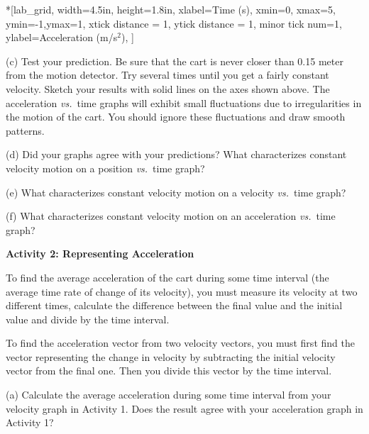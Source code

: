 \begin{lab_axis}*[lab_grid,
	width=4.5in, height=1.8in,
	xlabel={Time (s)},
	xmin=0, xmax=5,
	ymin=-1,ymax=1, 
	xtick distance = 1, 
	ytick distance = 1, 
	minor tick num=1,
	ylabel={Acceleration (m/s$^2$)},
	]
\end{lab_axis}



(c) Test your prediction. Be sure that the cart is never closer than 0.15 meter
from the motion detector. Try several times until you get a fairly constant
velocity. Sketch your results with solid lines on the axes shown above. The
acceleration \textit{vs.}~time graphs will exhibit small fluctuations due to irregularities
in the motion of the cart. You should ignore these fluctuations and draw smooth
patterns.
\answerspace{0.2in}

\pagebreak[2]
(d) Did your graphs agree with your predictions? What characterizes constant
velocity motion on a position \textit{vs.}~time graph? 
\answerspace{10mm}

(e) What characterizes constant velocity motion on a velocity \textit{vs.}~time graph?
\answerspace{10mm}

(f) What characterizes constant velocity motion on an acceleration \textit{vs.}~time graph?
\answerspace{10mm}

\textbf{Activity 2: Representing Acceleration} 

To find the average acceleration of the cart during some time interval (the
average time rate of change of its velocity), you must measure its velocity
at two different times, calculate the difference between the final value and
the initial value and divide by the time interval.

To find the acceleration vector from two velocity vectors, you must first find
the vector representing the change in velocity by subtracting the initial velocity
vector from the final one. Then you divide this vector by the time interval. 


(a) Calculate the average acceleration during some time interval from your velocity graph in Activity 1.  Does the result agree with your acceleration graph in Activity 1?
\answerspace{20mm}

